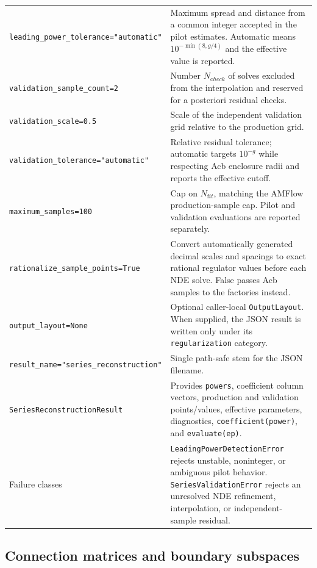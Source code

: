 \documentclass[11pt]{article}
\begin{document}
\begin{longtable}{L{0.36\textwidth}L{0.58\textwidth}}
\texttt{leading\_power\_}\newline\texttt{tolerance="automatic"} & Maximum spread and distance from a common
integer accepted in the pilot estimates.  Automatic means $10^{-\min(8,g/4)}$ and the
effective value is reported. \\
\texttt{validation\_sample\_count=2} & Number $N_{\mathrm check}$ of solves excluded from the
interpolation and reserved for a posteriori residual checks. \\
\texttt{validation\_scale=0.5} & Scale of the independent validation grid relative to the
production grid. \\
\texttt{validation\_tolerance=}\newline\texttt{"automatic"} & Relative residual tolerance; automatic targets
$10^{-g}$ while respecting Acb enclosure radii and reports the effective cutoff. \\
\texttt{maximum\_samples=100} & Cap on $N_{\mathrm fit}$, matching the AMFlow production-sample
cap.  Pilot and validation evaluations are reported separately. \\
\texttt{rationalize\_sample\_points=True} & Convert automatically generated decimal scales
and spacings to exact rational regulator values before each NDE solve.  False passes Acb
samples to the factories instead. \\
\texttt{output\_layout=None} & Optional caller-local \texttt{OutputLayout}.  When supplied,
the JSON result is written only under its \texttt{regularization} category. \\
\texttt{result\_name=}\newline\texttt{"series\_reconstruction"} & Single path-safe stem for
the JSON filename. \\
\texttt{SeriesReconstructionResult} & Provides \texttt{powers}, coefficient column vectors,
production and validation points/values, effective parameters, diagnostics,
\texttt{coefficient(power)}, and \texttt{evaluate(ep)}. \\
Failure classes & \texttt{LeadingPowerDetectionError} rejects unstable, noninteger, or
ambiguous pilot behavior.  \texttt{SeriesValidationError} rejects an unresolved NDE
refinement, interpolation, or independent-sample residual. \\
\bottomrule
\end{longtable}
\normalsize

\subsection{Connection matrices and boundary subspaces}
\end{document}
